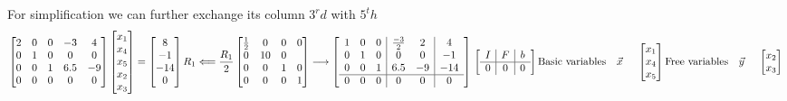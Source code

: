 \documentclass[11pt,a4paper]{article}
\begin{document}
For simplification we can further exchange its column $3^rd$ with $5^th$\\
\[
\begin{bmatrix}
2 & 0 & 0 & -3 & 4\\
0 & 1 & 0 & 0 & 0\\
0 & 0 & 1 & 6.5 & -9\\
0 & 0 & 0 & 0 & 0
\end{bmatrix}
\begin{bmatrix}
x_1\\x_4\\x_5\\x_2\\x_3
\end{bmatrix} = 
\begin{bmatrix}
8\\-1\\-14\\0
\end{bmatrix}

R_1 \Longleftarrow \frac{R_1}{2}\\

\begin{bmatrix}
\frac{1}{2} & 0 & 0 & 0\\
0 & 1 0 & 0\\
0 & 0 & 1 & 0\\
0 & 0 & 0 & 1
\end{bmatrix}
\longrightarrow
\left[{\begin{array}{ccc|cc|c}
1 & 0 & 0 & \frac{-3}{2} & 2 & 4\\
0 & 1 & 0 & 0 & 0 & -1\\
0 & 0 & 1 & 6.5 & -9 & -14 \\
\hline
0 & 0 & 0 & 0 & 0 & 0
\end{array}}\right]\\

\left[{\begin{array}{c|c|c}
I & F & b\\ \hline
0 & 0 & 0\\
\end{array}}\right]

\text{Basic variables}~~~ \Vec{x}~~~~ \begin{bmatrix}
                                        x_1\\x_4\\x_5
                                    \end{bmatrix}       
\text{Free variables}~~~ \Vec{y}~~~~ \begin{bmatrix}
                                        x_2\\x_3
                                    \end{bmatrix}  \\
                                    
\]
\end{document}
